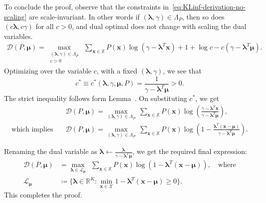 \documentclass{article}
\theoremstyle{plain}
\theoremstyle{definition}
\newcommand{\lrp}[1]{\left( #1 \right)}
\newcommand{\R}{\mathbb{R}}
\newcommand{\calX}{\mathcal X}
\newcommand{\calL}{\mathcal L}
\newcommand{\xvec}{\mathbf{x}}
\newcommand{\boldlambda}{\boldsymbol{\lambda}}
\newcommand{\boldmu}{\boldsymbol{\mu}}
\newcommand{\finitesupport}{\mathbb{X}}
\begin{document}
To conclude the proof, observe that the constraints in~\eqref{eq:KLinf-derivation-no-scaling} are scale-invariant. In other words if $(\boldlambda, \gamma) \in \Lambda_P$, then so does $(c \boldlambda, c \gamma)$ for all $c >0$, and dual optimal does not change with scaling the dual variables.
\begin{align}
    \mathcal D(P,\boldmu) = \max\limits_{\substack{(\boldlambda, \gamma) \in \Lambda_P \\ c>0}} ~ \sum\limits_{\xvec \in\finitesupport} P(\xvec) \log\lrp{ \gamma -  \boldlambda^T\xvec } + 1 + \log c - c\lrp{ \gamma  -  \boldlambda^T \boldmu}. 
\end{align}
Optimizing over the variable $c$, with a fixed $(\boldlambda, \gamma)$, we see that 
\[ c^* \equiv c^*(\boldlambda, \gamma, \boldmu, P) = \frac{1}{\gamma - \boldlambda^T \boldmu } > 0. \]
The strict inequality follows form Lemma~.  On substituting $c^*$, we get
\begin{align}
    &\mathcal D(P,\boldmu) = \max\limits_{(\boldlambda, \gamma) \in \Lambda_P} ~ \sum\limits_{\xvec\in\finitesupport} P(\xvec) \log\lrp{\frac{ \gamma - \boldlambda^T \xvec }{\gamma - \boldlambda^T \boldmu }},\\
    \text{which implies}\quad 
    &\mathcal D(P,\boldmu) = \max\limits_{(\boldlambda, \gamma) \in \Lambda_P} ~ \sum\limits_{\xvec \in\finitesupport} P(\xvec) \log\lrp{1 - \frac{ \boldlambda^T (\xvec-\boldmu) }{\gamma - \boldlambda^T \boldmu }}. 
\end{align}

Renaming the dual variable as $\boldlambda \leftarrow \frac{\boldlambda}{\gamma - \boldlambda^T \boldmu}$, we get the required final expression: 
\begin{align}
\mathcal D(P,\boldmu) 
&= \max\limits_{\boldlambda \in \calL_{\boldmu}} ~~\sum\limits_{\xvec \in\finitesupport} P(\xvec) \log\lrp{ 1- \boldlambda^T(\xvec-\boldmu) }, \quad\text{where} \\
\calL_{\boldmu} &\coloneqq \{\boldlambda \in \R^K: \min_{\xvec \in \calX} 1- \boldlambda^T(\xvec-\boldmu) \geq 0 \}. 
\end{align}
This completes the proof. \hfill \qedsymbol
\end{document}
